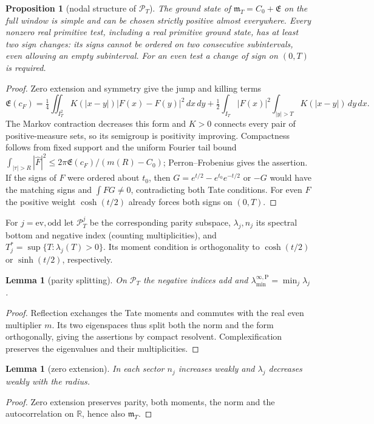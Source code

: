 \documentclass[10pt]{amsart}
\newtheorem{proposition}[theorem]{Proposition}
\newtheorem{lemma}[theorem]{Lemma}
\theoremstyle{definition}
\theoremstyle{remark}
\newcommand{\PT}{\mathcal P_T}
\newcommand{\IT}{I_T}
\newcommand{\Fh}{\widehat F}
\newcommand{\cF}{c_F}
\newcommand{\Lev}{\mathfrak E}
\newcommand{\mT}{\mathfrak m_T}
\newcommand{\laminfP}{\lambda^{\infty,\mathrm P}_{\min}}
\begin{document}
\begin{proposition}[nodal structure of $\PT$]\label{prop:nodes}
The ground state of $\mT=C_0+\Lev$ on the full window is simple and can
be chosen strictly positive almost everywhere. Every nonzero real primitive
test, including a real primitive ground state, has at least two sign changes:
its signs cannot be ordered on two consecutive subintervals, even allowing an
empty subinterval. For an even test a change of sign on $(0,T)$ is required.
\end{proposition}
\begin{proof}
Zero extension and symmetry give the jump and killing terms
\[
 \Lev(\cF)=\tfrac14\iint_{\IT^2}K(|x-y|)|F(x)-F(y)|^2\,dx\,dy
 +\tfrac12\int_{\IT}|F(x)|^2\!\int_{|y|>T}K(|x-y|)\,dy\,dx.
\]
The Markov contraction decreases this form and $K>0$ connects every
pair of positive-measure sets, so its semigroup is positivity improving.
Compactness follows from fixed support and the uniform Fourier tail
bound $\int_{|\tau|>R}|\Fh|^2\le2\pi\Lev(\cF)/(m(R)-C_0)$;
Perron--Frobenius gives the assertion. If the signs of $F$ were
ordered about $t_0$, then $G=e^{t/2}-e^{t_0}e^{-t/2}$ or $-G$
would have the matching signs and $\int FG\ne0$, contradicting
both Tate conditions. For even $F$ the positive weight $\cosh(t/2)$
already forces both signs on $(0,T)$.
\end{proof}

For $j=\mathrm{ev},\mathrm{odd}$ let $\PT^j$ be the corresponding parity
subspace, $\lambda_j,n_j$ its spectral bottom and negative index
(counting multiplicities), and $T_j^*=\sup\{T:\lambda_j(T)>0\}$.
Its moment condition is orthogonality to $\cosh(t/2)$ or $\sinh(t/2)$,
respectively.

\begin{lemma}[parity splitting]\label{lem:parity}
On $\PT$ the negative indices add and $\laminfP=\min_j\lambda_j$.
\end{lemma}
\begin{proof}
Reflection exchanges the Tate moments and commutes with the real even
multiplier $m$. Its two eigenspaces thus split both the norm and the form
orthogonally, giving the assertions by compact resolvent. Complexification
preserves the eigenvalues and their multiplicities.
\end{proof}

\begin{lemma}[zero extension]\label{lem:zeroext}
In each sector $n_j$ increases weakly and $\lambda_j$ decreases weakly
with the radius.
\end{lemma}
\begin{proof}
Zero extension preserves parity, both moments, the norm and the
autocorrelation on $\mathbb R$, hence also $\mT$.
\end{proof}
\end{document}
